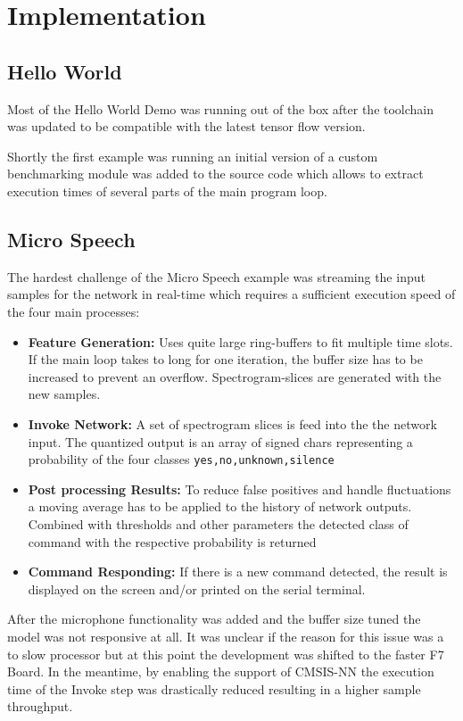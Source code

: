 \documentclass[oneside]{tum-book}
\begin{document}
\section{Implementation}

\subsection{Hello World}

Most of the Hello World Demo was running out of the box after the toolchain was updated to be compatible with the latest tensor flow version.

Shortly the first example was running an initial version of a custom benchmarking module was added to the source code which allows to extract execution times of several parts of the main program loop.

\subsection{Micro Speech}

The hardest challenge of the Micro Speech example was streaming the input samples for the network in real-time which requires a sufficient execution speed of the four main processes:

\begin{itemize}
    \item \textbf{Feature Generation:} Uses quite large ring-buffers to fit multiple time slots. If the main loop takes to long for one iteration, the buffer size has to be increased to prevent an overflow. Spectrogram-slices are generated with the new samples.
    \item \textbf{Invoke Network:} A set of spectrogram slices is feed into the the network input. The quantized output is an array of signed chars representing a probability of the four classes \lstinline{yes,no,unknown,silence}
    \item \textbf{Post processing Results:} To reduce false positives and handle fluctuations a moving average has to be applied to the history of network outputs. Combined with thresholds and other parameters the detected class of command with the respective probability is returned 
    \item \textbf{Command Responding:} If there is a new command detected, the result is displayed on the screen and/or printed on the serial terminal. 
\end{itemize}

After the microphone functionality was added and the buffer size tuned the model was not responsive at all. It was unclear if the reason for this issue was a to slow processor but at this point the development was shifted to the faster F7 Board. In the meantime, by enabling the support of CMSIS-NN the execution time of the Invoke step was drastically reduced resulting in a higher sample throughput. 
\end{document}
